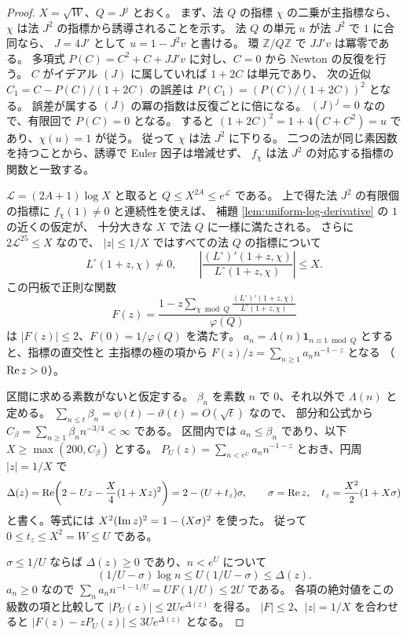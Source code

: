 \begin{proof}
\(X=\sqrt W\)、\(Q=J^j\) とおく。
まず、法 \(Q\) の指標 \(\chi\) の二乗が主指標なら、
\(\chi\) は法 \(J^2\) の指標から誘導されることを示す。
法 \(Q\) の単元 \(u\) が法 \(J^2\) で \(1\) に合同なら、
\(J=4J'\) として \(u=1-J^2v\) と書ける。
環 \(\mathbb Z/Q\mathbb Z\) で \(JJ'v\) は冪零である。
多項式 \(P(C)=C^2+C+JJ'v\) に対し、\(C=0\) から Newton の反復を行う。
\(C\) がイデアル \((J)\) に属していれば \(1+2C\) は単元であり、
次の近似 \(C_1=C-P(C)/(1+2C)\) の誤差は
\(P(C_1)=(P(C)/(1+2C))^2\) となる。
誤差が属する \((J)\) の冪の指数は反復ごとに倍になる。
\((J)^j=0\) なので、有限回で \(P(C)=0\) となる。
すると \((1+2C)^2=1+4(C+C^2)=u\) であり、\(\chi(u)=1\) が従う。
従って \(\chi\) は法 \(J^2\) に下りる。
二つの法が同じ素因数を持つことから、誘導で Euler 因子は増減せず、
\(f_\chi\) は法 \(J^2\) の対応する指標の関数と一致する。

\(\mathcal L=(2A+1)\log X\) と取ると \(Q\le X^{2A}\le e^\mathcal L\) である。
上で得た法 \(J^2\) の有限個の指標に \(f_\chi(1)\ne0\) と連続性を使えば、
補題 \ref{lem:uniform-log-derivative} の \(1\) の近くの仮定が、
十分大きな \(X\) で法 \(Q\) に一様に満たされる。
さらに \(2\mathcal L^{25}\le X\) なので、
\(|z|\le1/X\) ではすべての法 \(Q\) の指標について
\[
 L^\circ(1+z,\chi)\ne0,\qquad
 \left|\frac{(L^\circ)'(1+z,\chi)}{L^\circ(1+z,\chi)}\right|\le X.
\]
この円板で正則な関数
\[
 F(z)=\frac{1-z\displaystyle\sum_{\chi\bmod Q}
                   \frac{(L^\circ)'(1+z,\chi)}{L^\circ(1+z,\chi)}}{\varphi(Q)}
\]
は \(|F(z)|\le2\)、\(F(0)=1/\varphi(Q)\) を満たす。
\(a_n=\Lambda(n)\mathbf 1_{n\equiv1\bmod Q}\) とすると、指標の直交性と
主指標の極の項から \(F(z)/z=\sum_{n\ge1}a_n n^{-1-z}\) となる
（\(\operatorname{Re} z>0\)）。

区間に求める素数がないと仮定する。
\(\beta_n\) を素数 \(n\) で \(0\)、それ以外で \(\Lambda(n)\) と定める。
\(\sum_{n\le t}\beta_n=\psi(t)-\vartheta(t)=O(\sqrt t)\) なので、
部分和公式から \(C_\beta=\sum_{n\ge1}\beta_n n^{-3/4}<\infty\) である。
区間内では \(a_n\le\beta_n\) であり、以下 \(X\ge\max(200,C_\beta)\) とする。
\(P_U(z)=\sum_{n<e^U}a_n n^{-1-z}\) とおき、円周 \(|z|=1/X\) で
\[
 \Delta(z)=\operatorname{Re}\!\left(2-Uz-\frac X4(1+Xz)^2\right)
        =2-(U+t_z)\sigma,\qquad
 \sigma=\operatorname{Re} z,\quad t_z=\frac{X^2}{2}(1+X\sigma)
\]
と書く。等式には \(X^2(\operatorname{Im} z)^2=1-(X\sigma)^2\) を使った。
従って \(0\le t_z\le X^2=W\le U\) である。

\(\sigma\le1/U\) ならば \(\Delta(z)\ge0\) であり、\(n<e^U\) について
\[
 (1/U-\sigma)\log n\le U(1/U-\sigma)\le\Delta(z).
\]
\(a_n\ge0\) なので \(\sum_n a_n n^{-1-1/U}=UF(1/U)\le2U\) である。
各項の絶対値をこの級数の項と比較して
\(|P_U(z)|\le2Ue^{\Delta(z)}\) を得る。
\(|F|\le2\)、\(|z|=1/X\) を合わせると
\(|F(z)-zP_U(z)|\le3Ue^{\Delta(z)}\) となる。


\end{proof}
